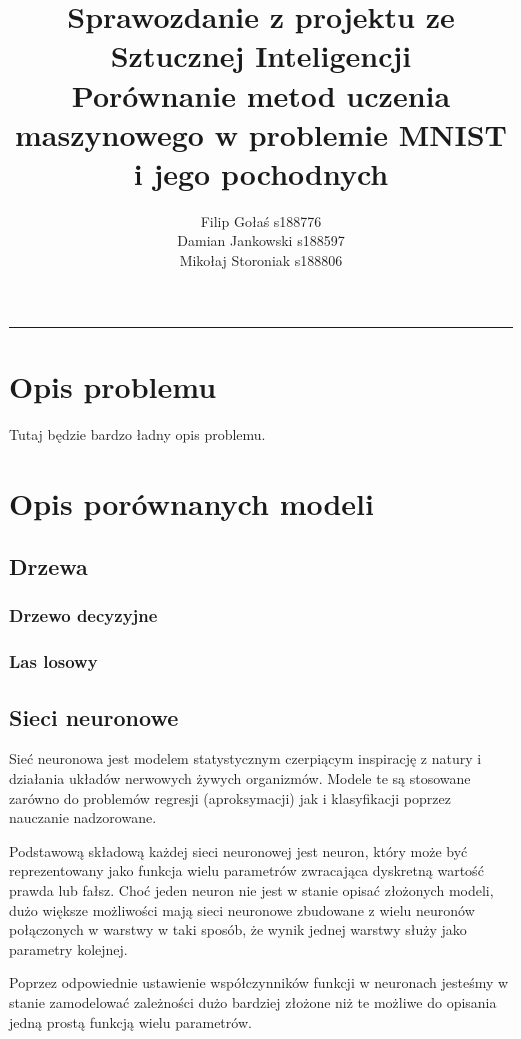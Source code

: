 \documentclass{article}
\title{Sprawozdanie z projektu ze Sztucznej Inteligencji \\ Porównanie metod uczenia maszynowego w problemie MNIST i jego pochodnych}
\author{Filip Gołaś s188776 \\ Damian Jankowski s188597 \\ Mikołaj Storoniak s188806}
\begin{document}
\maketitle

\rule{\textwidth}{0.4pt}

\section{Opis problemu}

Tutaj będzie bardzo ładny opis problemu.

\section{Opis porównanych modeli}

\subsection{Drzewa}
\subsubsection{Drzewo decyzyjne}
\subsubsection{Las losowy}

\subsection{Sieci neuronowe}
Sieć neuronowa jest modelem statystycznym czerpiącym inspirację z natury i działania układów nerwowych żywych organizmów.
Modele te są stosowane zarówno do problemów regresji (aproksymacji) jak i klasyfikacji poprzez nauczanie nadzorowane.

Podstawową składową każdej sieci neuronowej jest neuron, który może być reprezentowany jako funkcja wielu parametrów zwracająca dyskretną wartość
prawda lub fałsz. Choć jeden neuron nie jest w stanie opisać złożonych modeli, dużo większe możliwości mają sieci neuronowe zbudowane z wielu neuronów
połączonych w warstwy w taki sposób, że wynik jednej warstwy służy jako parametry kolejnej.


Poprzez odpowiednie ustawienie współczynników funkcji w neuronach jesteśmy w stanie zamodelować zależności dużo bardziej złożone niż te możliwe do opisania jedną
prostą funkcją wielu parametrów.
\end{document}
